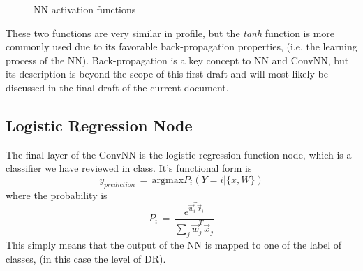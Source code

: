 \documentclass[letterpaper,12pt]{article}
\begin{document}
\begin{figure}[htbp]
\begin{center}
\caption{NN activation functions}
\label{marking_image}
\end{center}
\end{figure}

These two functions are very similar in profile, but the \textit{tanh} function is more commonly used due to its favorable back-propagation properties, (i.e. the learning process of the NN). Back-propagation is a key concept to NN and ConvNN, but its description is beyond the scope of this first draft and will most likely be discussed in the final draft of the current document.

\subsection{Logistic Regression Node}

The final layer of the ConvNN is the logistic regression function node, which is a classifier we have reviewed in class. It's functional form is \cite{deep}
\begin{equation}
y_{prediction} \, = \, \text{argmax} P_i (Y = i | \{x, W\})
\end{equation}
where the probability is
\begin{equation}
P_i \, = \, \frac{e^{\vec{w}_i^T \vec{x}_i}}{\sum_j \vec{w}_j^T \vec{x}_j }
\end{equation}
This simply means that the output of the NN is mapped to one of the label of classes, (in this case the level of DR).
\end{document}

